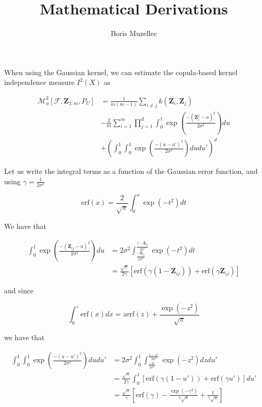 \documentclass[10pt,a4paper]{article}
\author{Boris Muzellec}
\title{Mathematical Derivations}
\begin{document}
When using the Gaussian kernel, we can estimate the copula-based kernel independence measure $I^2(X)$ as


\begin{equation}
\begin{aligned}
\mathcal{M}_u^2[\mathcal{F}, \boldsymbol{Z}_{1:m}, P_U]  &= \frac{1}{m(m-1)}\sum_{i\neq j}k(\boldsymbol{Z}_{i}, \boldsymbol{Z}_{j})\\
& - \frac{2}{m}\sum_{i=1}^{m}\prod_{j=1}^{d}\int_0^1 \exp\left(\frac{-(\boldsymbol{Z}_{i}^j - u)^2}{2\sigma^2}\right)du \\
& + \left(\int_0^1\int_0^1\exp\left(\frac{-(u-u')^2}{2\sigma^2}\right)du du'\right)^d
\end{aligned}
\end{equation}

Let us write the integral terms as a function of the Gaussian error function, and using $\gamma = \frac{1}{2\sigma^2}$

$$\mathrm{erf}(x) = \frac{2}{\sqrt{\pi}}\int_0^x \exp(-t^2)dt$$

We have that 

\begin{align}
\int_0^1\exp\left(\frac{-(\boldsymbol{Z}_{ij} - u)^2}{2\sigma^2}\right) du &= 2\sigma^2\int_{\frac{-\boldsymbol{Z}_{ij}}{2\sigma^2}}^{\frac{1-\boldsymbol{Z}_{ij}}{2\sigma^2}}\exp(-t^2) dt \\
&= \frac{\sqrt{\pi}}{2\gamma}[\mathrm{erf}(\gamma(1 - \boldsymbol{Z}_{ij})) + \mathrm{erf}(\gamma\boldsymbol{Z}_{ij})]
\end{align}

and since

\begin{equation}
\int_0^z \mathrm{erf}(x)dx = z\mathrm{erf}(z) + \frac{\exp(-z^2)}{\sqrt{\pi}}
\end{equation}

we have that

\begin{align}
\int_0^1\int_0^1 \exp\left(\frac{-(u-u')^2}{2\sigma^2}\right)du du' &= 2\sigma^2 \int_0^1\int_{\frac{-u'}{2\sigma^2}}^{\frac{1-u'}{2\sigma^2}}\exp(-z^2)dzdu'\\
&= \frac{\sqrt{\pi}}{2\gamma} \int_0^1 \left[\mathrm{erf}(\gamma(1-u')) + \mathrm{erf}(\gamma u')\right]du' \\
&= \frac{\sqrt{\pi}}{\gamma}\left[\mathrm{erf}(\gamma) - \frac{\exp(-\gamma^2)}{\gamma\sqrt{\pi}} + \frac{1}{\gamma\sqrt{\pi}}\right]
\end{align}
\end{document}
